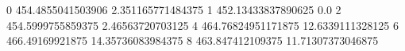 0 454.4855041503906 2.351165771484375
1 452.13433837890625 0.0
2 454.5999755859375 2.46563720703125
4 464.76824951171875 12.6339111328125
6 466.49169921875 14.35736083984375
8 463.847412109375 11.71307373046875
